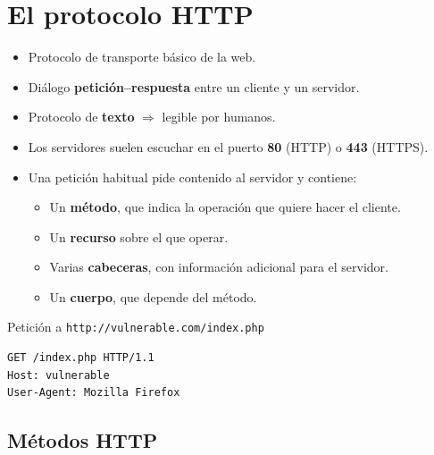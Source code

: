 \documentclass[11pt,a4paper]{report}
\begin{document}
\section{El protocolo HTTP}
 
\begin{itemize}
  \item Protocolo de transporte básico de la web.
  \item Diálogo \textbf{petición--respuesta} entre un cliente y un servidor.
  \item Protocolo de \textbf{texto} $\Rightarrow$ legible por humanos.
  \item Los servidores suelen escuchar en el puerto \textbf{80} (HTTP) o \textbf{443} (HTTPS).
  \item Una petición habitual pide contenido al servidor y contiene:
    \begin{itemize}
      \item Un \textbf{método}, que indica la operación que quiere hacer el cliente.
      \item Un \textbf{recurso} sobre el que operar.
      \item Varias \textbf{cabeceras}, con información adicional para el servidor.
      \item Un \textbf{cuerpo}, que depende del método.
    \end{itemize}
\end{itemize}
 
\begin{ejemplo}{Petición a \texttt{http://vulnerable.com/index.php}}
\begin{verbatim}
GET /index.php HTTP/1.1
Host: vulnerable
User-Agent: Mozilla Firefox
\end{verbatim}
\end{ejemplo}
 
\subsection{Métodos HTTP}
 
\end{document}
